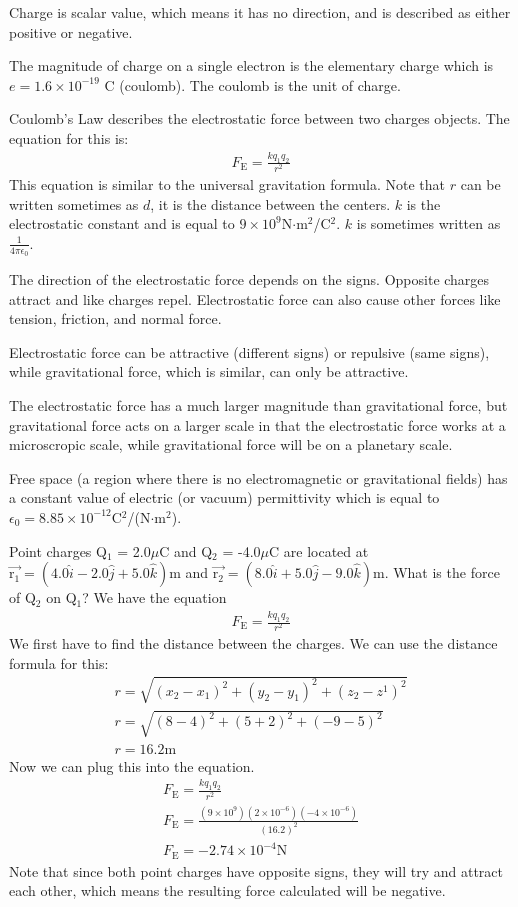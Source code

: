 \documentclass[../em.tex]{subfiles}
\begin{document}
Charge is scalar value, which means it has no direction, and is described as either positive or negative.

The magnitude of charge on a single electron is the elementary charge which is $e = 1.6\times 10^{-19}$ C (coulomb). The coulomb is the unit of charge.

Coulomb's Law describes the electrostatic force between two charges objects. The equation for this is:
\begin{align*}
    F_\text{E}=\frac{kq_1q_2}{r^2}
\end{align*}
This equation is similar to the universal gravitation formula. Note that $r$ can be written sometimes as $d$, it is the distance between the centers. $k$ is the electrostatic constant and is equal to $9\times10^9$N$\cdot $m$^2$/C$^2$. $k$ is sometimes written as $\frac{1}{4\pi\epsilon_0}$.

The direction of the electrostatic force depends on the signs. Opposite charges attract and like charges repel. Electrostatic force can also cause other forces like tension, friction, and normal force.

Electrostatic force can be attractive (different signs) or repulsive (same signs), while gravitational force, which is similar, can only be attractive. 

The electrostatic force has a much larger magnitude than gravitational force, but gravitational force acts on a larger scale in that the electrostatic force works at a microscropic scale, while gravitational force will be on a planetary scale.

Free space (a region where there is no electromagnetic or gravitational fields) has a constant value of electric (or vacuum) permittivity which is equal to $\epsilon_0 = 8.85\times10^{-12}$C$^2$/(N$\cdot$m$^2$).
\begin{example}
    Point charges Q$_1$ = 2.0$\mu$C and Q$_2$ = -4.0$\mu$C are located at $\vec{\text{r}_1} = (4.0\hat{i}-2.0\hat{j}+5.0\hat{k})$m and 
    $\vec{\text{r}_2} = (8.0\hat{i}+5.0\hat{j}-9.0\hat{k})$m. What is the force of Q$_2$ on Q$_1$?
    \smallbreak
    We have the equation 
    \begin{align*}
        F_\text{E}=\frac{kq_1q_2}{r^2}
    \end{align*}
    We first have to find the distance between the charges. We can use the distance formula for this:
    \begin{align*}
        r = \sqrt{(x_2-x_1)^2+(y_2-y_1)^2+(z_2-z^1)^2}\\
        r = \sqrt{(8-4)^2+(5+2)^2+(-9-5)^2}\\
        r = 16.2 \text{m}
    \end{align*}
    Now we can plug this into the equation.
    \begin{align*}
        F_\text{E}=\frac{kq_1q_2}{r^2}\\
        F_\text{E}=\frac{(9\times10^9)(2\times10^{-6})(-4\times10^{-6})}{(16.2)^2}\\
        F_\text{E}=-2.74\times10^{-4}\text{N}
    \end{align*}
    Note that since both point charges have opposite signs, they will try and attract each other, which means the resulting force calculated 
    will be negative.
\end{example}
\end{document}
